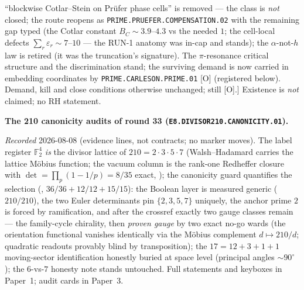 \documentclass[11pt,a4paper]{article}
\begin{document}
{``blockwise Cotlar--Stein on Pr\"ufer phase cells'' is removed
--- the class is \emph{not} closed; the route reopens as
\texttt{PRIME.PRUEFER.COMPENSATION.02} with the remaining gap
typed (the Cotlar constant $B_C \sim 3.9$--$4.3$ vs the needed
$1$; the cell-local defects $\sum_r\varepsilon_r \sim 7$--$10$
--- the RUN-1 anatomy was in-cap and stands); the
$\alpha$-not-$h$ law is retired (it was the truncation's
signature).  The $\pi$-resonance critical structure and the
discrimination stand; the surviving demand is now carried in
embedding coordinates by \texttt{PRIME.CARLESON.PRIME.01} [O]
(registered below).  Demand, kill and close conditions
otherwise unchanged; still [O].]
Existence is \emph{not}
claimed; no RH statement.\par}

\par\smallskip\noindent\textbf{The 210 canonicity audits of
round 33 (\texttt{E8.DIVISOR210.\allowbreak CANONICITY.01}).}
{\sloppy
\emph{Recorded} 2026-08-08 (evidence lines, not contracts; no
marker moves).  The label register $\mathbb{F}_2^4$ \emph{is}
the divisor lattice of $210 = 2\cdot3\cdot5\cdot7$
(Walsh--Hadamard carries the lattice M\"obius function; the
vacuum column is the rank-one Redheffer closure with
$\det = \prod_p(1 - 1/p) = 8/35$ exact,
); the canonicity guard
quantifies the selection
(, $36/36 + 12/12 + 15/15$):
the Boolean layer is measured generic ($210/210$), the two
Euler determinants pin $\{2,3,5,7\}$ uniquely, the anchor prime
$2$ is forced by ramification, and after the crossref exactly
two gauge classes remain --- the family-cycle chirality, then
\emph{proven gauge} by two exact no-go wards (the orientation
functional vanishes identically via the M\"obius complement
$d \mapsto 210/d$; quadratic readouts provably blind by
transposition); the $17 = 12{+}3{+}1{+}1$ moving-sector
identification honestly buried at space level (principal angles
${\sim}90^\circ$); the $6$-vs-$7$ honesty note stands
untouched.  Full statements and keyboxes in Paper~1; audit
cards in Paper~3.\par}
\end{document}
